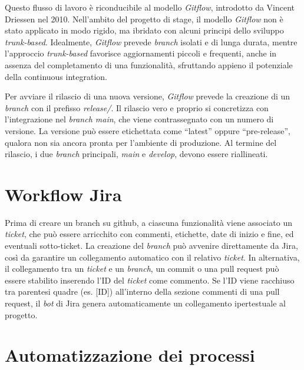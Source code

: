 \vspace{10pt}
\par\noindent Questo flusso di lavoro è riconducibile al modello \textit{Gitflow}, introdotto da Vincent Driessen nel 2010. Nell’ambito del progetto di stage, il modello \textit{Gitflow} non è stato applicato in modo rigido, ma ibridato con alcuni principi dello sviluppo \textit{trunk-based}. Idealmente, \textit{Gitflow} prevede \textit{branch} isolati e di lunga durata, mentre l’approccio \textit{trunk-based} favorisce aggiornamenti piccoli e frequenti, anche in assenza del completamento di una funzionalità, sfruttando appieno il potenziale della \gls{continuous integration}.

\vspace{10pt}
\par\noindent Per avviare il rilascio di una nuova versione, \textit{Gitflow} prevede la creazione di un \textit{branch} con il prefisso \textit{release/}. Il rilascio vero e proprio si concretizza con l’integrazione nel \textit{branch main}, che viene contrassegnato con un numero di versione. La versione può essere etichettata come “latest” oppure “pre-release”, qualora non sia ancora pronta per l’ambiente di produzione. Al termine del rilascio, i due \textit{branch} principali, \textit{main} e \textit{develop}, devono essere riallineati.

\section{Workflow Jira}

\par Prima di creare un branch su \gls{github}, a ciascuna funzionalità viene associato un \textit{ticket}, che può essere arricchito con commenti, etichette, date di inizio e fine, ed eventuali sotto-ticket. La creazione del \textit{branch} può avvenire direttamente da Jira, così da garantire un collegamento automatico con il relativo \textit{ticket}. In alternativa, il collegamento tra un \textit{ticket} e un \textit{branch}, un \gls{commit} o una \gls{pull request} può essere stabilito inserendo l’ID del \textit{ticket} come commento. Se l’ID viene racchiuso tra parentesi quadre (es. [ID]) all’interno della sezione commenti di una pull request, il \textit{bot} di Jira genera automaticamente un collegamento ipertestuale al progetto.

\section{Automatizzazione dei processi}

